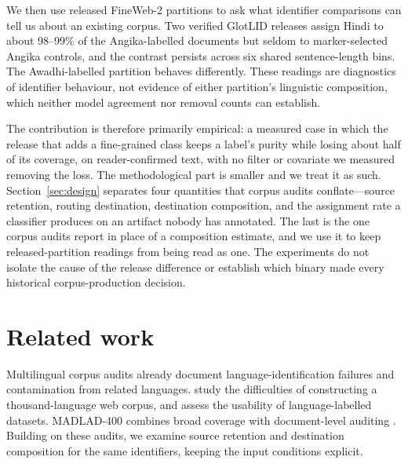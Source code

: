 \documentclass[final]{clv2025}
\begin{document}
We then use released FineWeb-2 partitions to ask what identifier comparisons can tell us about an existing corpus. Two verified GlotLID releases assign Hindi to about 98--99\% of the Angika-labelled documents but seldom to marker-selected Angika controls, and the contrast persists across six shared sentence-length bins. The Awadhi-labelled partition behaves differently. These readings are diagnostics of identifier behaviour, not evidence of either partition's linguistic composition, which neither model agreement nor removal counts can establish.

The contribution is therefore primarily empirical: a measured case in which the release that adds a fine-grained class keeps a label's purity while losing about half of its coverage, on reader-confirmed text, with no filter or covariate we measured removing the loss. The methodological part is smaller and we treat it as such. Section~\ref{sec:design} separates four quantities that corpus audits conflate---source retention, routing destination, destination composition, and the assignment rate a classifier produces on an artifact nobody has annotated. The last is the one corpus audits report in place of a composition estimate, and we use it to keep released-partition readings from being read as one. The experiments do not isolate the cause of the release difference or establish which binary made every historical corpus-production decision.

\section{Related work}\label{sec:related}

Multilingual corpus audits already document language-identification failures and contamination from related languages. \citet{caswell-etal-2020-language} study the difficulties of constructing a thousand-language web corpus, and \citet{kreutzer-etal-2022-quality} assess the usability of language-labelled datasets. MADLAD-400 combines broad coverage with document-level auditing \citep{kudugunta-etal-2023-madlad}. Building on these audits, we examine source retention and destination composition for the same identifiers, keeping the input conditions explicit.
\end{document}
